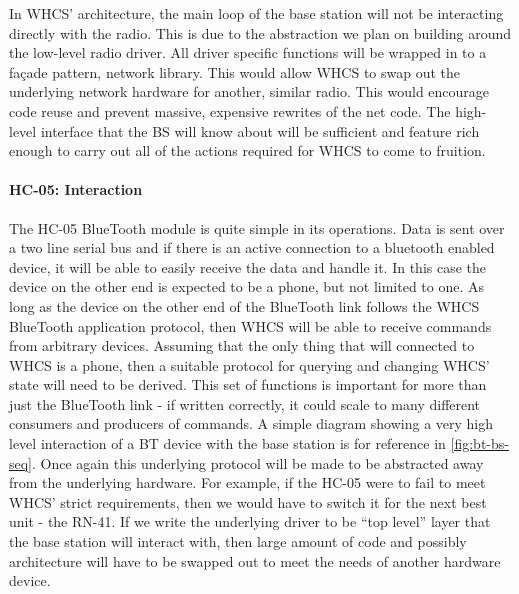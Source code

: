 In WHCS' architecture, the main loop of the base station will not be
interacting directly with the radio. This is due to the abstraction we plan on
building around the low-level radio driver. All driver specific functions will
be wrapped in to a fa\c{c}ade pattern, network library. This would allow WHCS
to swap out the underlying network hardware for another, similar radio. This
would encourage code reuse and prevent massive, expensive rewrites of the
net code. The high-level interface that the BS will know about will be
sufficient and feature rich enough to carry out all of the actions required for
WHCS to come to fruition.

\paragraph{HC-05: Interaction}
The HC-05 BlueTooth module is quite simple in its operations. Data is sent over
a two line serial bus and if there is an active connection to a bluetooth
enabled device, it will be able to easily receive the data and handle it. In
this case the device on the other end is expected to be a phone, but not
limited to one. As long as the device on the other end of the BlueTooth link
follows the WHCS BlueTooth application protocol, then WHCS will be able to
receive commands from arbitrary devices. Assuming that the only thing that will
connected to WHCS is a phone, then a suitable protocol for querying and
changing WHCS' state will need to be derived. This set of functions is
important for more than just the BlueTooth link - if written correctly, it
could scale to many different consumers and producers of commands. A simple
diagram showing a very high level interaction of a BT device with the base
station is for reference in \autoref{fig:bt-bs-seq}. Once again
this underlying protocol will be made to be abstracted away from the underlying
hardware. For example, if the HC-05 were to fail to meet WHCS' strict
requirements, then we would have to switch it for the next best unit - the
RN-41. If we write the underlying driver to be ``top level'' layer that the
base station will interact with, then large amount of code and possibly
architecture will have to be swapped out to meet the needs of another hardware
device.


